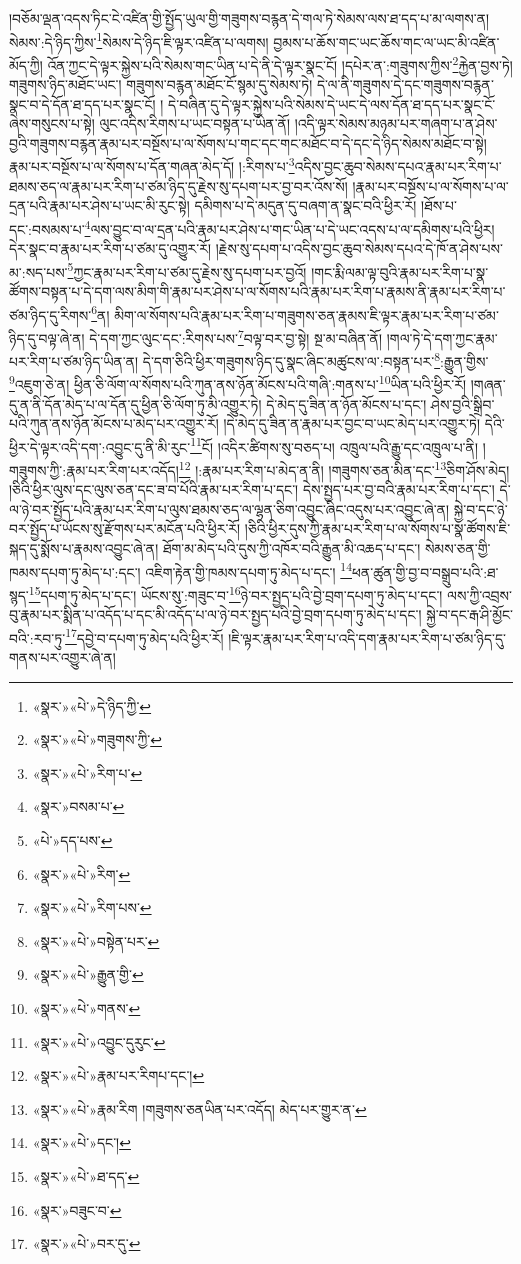 །བཅོམ་ལྡན་འདས་ཏིང་ངེ་འཛིན་གྱི་སྤྱོད་ཡུལ་གྱི་གཟུགས་བརྙན་དེ་གལ་ཏེ་སེམས་ལས་ཐ་དད་པ་མ་ལགས་ན། སེམས་:དེ་ཉིད་ཀྱིས་\footnote{«སྣར་»«པེ་»དེ་ཉིད་ཀྱི་}སེམས་དེ་ཉིད་ཇི་ལྟར་འཛིན་པ་ལགས། བྱམས་པ་ཆོས་གང་ཡང་ཆོས་གང་ལ་ཡང་མི་འཛིན་མོད་ཀྱི། འོན་ཀྱང་དེ་ལྟར་སྐྱེས་པའི་སེམས་གང་ཡིན་པ་དེ་ནི་དེ་ལྟར་སྣང་ངོ། །དཔེར་ན་:གཟུགས་ཀྱིས་\footnote{«སྣར་»«པེ་»གཟུགས་ཀྱི་}རྐྱེན་བྱས་ཏེ། གཟུགས་ཉིད་མཐོང་ཡང་། གཟུགས་བརྙན་མཐོང་ངོ་སྙམ་དུ་སེམས་ཏེ། དེ་ལ་ནི་གཟུགས་དེ་དང་གཟུགས་བརྙན་སྣང་བ་དེ་དོན་ཐ་དད་པར་སྣང་ངོ། །
དེ་བཞིན་དུ་དེ་ལྟར་སྐྱེས་པའི་སེམས་དེ་ཡང་དེ་ལས་དོན་ཐ་དད་པར་སྣང་ངོ་ཞེས་གསུངས་པ་སྟེ། ལུང་འདིས་རིགས་པ་ཡང་བསྟན་པ་ཡིན་ནོ། །འདི་ལྟར་སེམས་མཉམ་པར་གཞག་པ་ན་ཤེས་བྱའི་གཟུགས་བརྙན་རྣམ་པར་བསྔོས་པ་ལ་སོགས་པ་གང་དང་གང་མཐོང་བ་དེ་དང་དེ་ཉིད་སེམས་མཐོང་བ་སྟེ། རྣམ་པར་བསྔོས་པ་ལ་སོགས་པ་དོན་གཞན་མེད་དོ། །:རིགས་པ་\footnote{«སྣར་»«པེ་»རིག་པ་}འདིས་བྱང་ཆུབ་སེམས་དཔའ་རྣམ་པར་རིག་པ་ཐམས་ཅད་ལ་རྣམ་པར་རིག་པ་ཙམ་ཉིད་དུ་རྗེས་སུ་དཔག་པར་བྱ་བར་འོས་སོ། །རྣམ་པར་བསྔོས་པ་ལ་སོགས་པ་ལ་དྲན་པའི་རྣམ་པར་ཤེས་པ་ཡང་མི་རུང་སྟེ། དམིགས་པ་དེ་མདུན་དུ་བཞག་ན་སྣང་བའི་ཕྱིར་རོ། །ཐོས་པ་དང་:བསམས་པ་\footnote{«སྣར་»བསམ་པ་}ལས་བྱུང་བ་ལ་དྲན་པའི་རྣམ་པར་ཤེས་པ་གང་ཡིན་པ་དེ་ཡང་འདས་པ་ལ་དམིགས་པའི་ཕྱིར། དེར་སྣང་བ་རྣམ་པར་རིག་པ་ཙམ་དུ་འགྱུར་རོ། །རྗེས་སུ་དཔག་པ་འདིས་བྱང་ཆུབ་སེམས་དཔའ་དེ་ཁོ་ན་ཤེས་པས་མ་:སད་པས་\footnote{«པེ་»དད་པས་}ཀྱང་རྣམ་པར་རིག་པ་ཙམ་དུ་རྗེས་སུ་དཔག་པར་བྱའོ། །གང་རྨི་ལམ་ལྟ་བུའི་རྣམ་པར་རིག་པ་སྣ་ཚོགས་བསྟན་པ་དེ་དག་ལས་མིག་གི་རྣམ་པར་ཤེས་པ་ལ་སོགས་པའི་རྣམ་པར་རིག་པ་རྣམས་ནི་རྣམ་པར་རིག་པ་ཙམ་ཉིད་དུ་རིགས་\footnote{«སྣར་»«པེ་»རིག་}ན། མིག་ལ་སོགས་པའི་རྣམ་པར་རིག་པ་གཟུགས་ཅན་རྣམས་ཇི་ལྟར་རྣམ་པར་རིག་པ་ཙམ་ཉིད་དུ་བལྟ་ཞེ་ན། དེ་དག་ཀྱང་ལུང་དང་:རིགས་པས་\footnote{«སྣར་»«པེ་»རིག་པས་}བལྟ་བར་བྱ་སྟེ། སྔ་མ་བཞིན་ནོ། །གལ་ཏེ་དེ་དག་ཀྱང་རྣམ་པར་རིག་པ་ཙམ་ཉིད་ཡིན་ན། དེ་དག་ཅིའི་ཕྱིར་གཟུགས་ཉིད་དུ་སྣང་ཞིང་མཚུངས་ལ་:བསྟན་པར་\footnote{«སྣར་»«པེ་»བསྟེན་པར་}:རྒྱུན་གྱིས་\footnote{«སྣར་»«པེ་»རྒྱུན་གྱི་}འཇུག་ཅེ་ན། ཕྱིན་ཅི་ལོག་ལ་སོགས་པའི་ཀུན་ནས་ཉོན་མོངས་པའི་གཞི་:གནས་པ་\footnote{«སྣར་»«པེ་»གནས་}ཡིན་པའི་ཕྱིར་རོ། །གཞན་དུ་ན་ནི་དོན་མེད་པ་ལ་དོན་དུ་ཕྱིན་ཅི་ལོག་ཏུ་མི་འགྱུར་ཏེ། དེ་མེད་དུ་ཟིན་ན་ཉོན་མོངས་པ་དང་། ཤེས་བྱའི་སྒྲིབ་པའི་ཀུན་ནས་ཉོན་མོངས་པ་མེད་པར་འགྱུར་རོ། །དེ་མེད་དུ་ཟིན་ན་རྣམ་པར་བྱང་བ་ཡང་མེད་པར་འགྱུར་ཏེ། དེའི་ཕྱིར་དེ་ལྟར་འདི་དག་:འབྱུང་དུ་ནི་མི་རུང་\footnote{«སྣར་»«པེ་»འབྱུང་དུརུང་}ངོ། །འདིར་ཚིགས་སུ་བཅད་པ། འཁྲུལ་པའི་རྒྱུ་དང་འཁྲུལ་པ་ནི། །གཟུགས་ཀྱི་:རྣམ་པར་རིག་པར་འདོད།\footnote{«སྣར་»«པེ་»རྣམ་པར་རིགཔ་དང་།} །:རྣམ་པར་རིག་པ་མེད་ན་ནི། །གཟུགས་ཅན་མིན་དང་\footnote{«སྣར་»«པེ་»རྣམ་རིག །གཟུགས་ཅནཡིན་པར་འདོད། མེད་པར་གྱུར་ན་}ཅིག་ཤོས་མེད། །ཅིའི་ཕྱིར་ལུས་དང་ལུས་ཅན་དང་ཟ་བ་པོའི་རྣམ་པར་རིག་པ་དང་། དེས་སྤྱད་པར་བྱ་བའི་རྣམ་པར་རིག་པ་དང་། དེ་ལ་ཉེ་བར་སྤྱོད་པའི་རྣམ་པར་རིག་པ་ལུས་ཐམས་ཅད་ལ་ལྷན་ཅིག་འབྱུང་ཞིང་འདུས་པར་འབྱུང་ཞེ་ན། སྐྱེ་བ་དང་ཉེ་བར་སྤྱོད་པ་ཡོངས་སུ་རྫོགས་པར་མངོན་པའི་ཕྱིར་རོ། །ཅིའི་ཕྱིར་དུས་ཀྱི་རྣམ་པར་རིག་པ་ལ་སོགས་པ་སྣ་ཚོགས་ཇི་སྐད་དུ་སྨོས་པ་རྣམས་འབྱུང་ཞེ་ན། ཐོག་མ་མེད་པའི་དུས་ཀྱི་འཁོར་བའི་རྒྱུན་མི་འཆད་པ་དང་། སེམས་ཅན་གྱི་ཁམས་དཔག་ཏུ་མེད་པ་:དང་། འཇིག་རྟེན་གྱི་ཁམས་དཔག་ཏུ་མེད་པ་དང་། \footnote{«སྣར་»«པེ་»དང་།  }ཕན་ཚུན་གྱི་བྱ་བ་བསྒྲུབ་པའི་:ཐ་སྙད་\footnote{«སྣར་»«པེ་»ཐ་དད་}དཔག་ཏུ་མེད་པ་དང་། ཡོངས་སུ་:གཟུང་བ་\footnote{«སྣར་»བཟུང་བ་}ཉེ་བར་སྤྱད་པའི་བྱེ་བྲག་དཔག་ཏུ་མེད་པ་དང་། ལས་ཀྱི་འབྲས་བུ་རྣམ་པར་སྨིན་པ་འདོད་པ་དང་མི་འདོད་པ་ལ་ཉེ་བར་སྤྱད་པའི་བྱེ་བྲག་དཔག་ཏུ་མེད་པ་དང་། སྐྱེ་བ་དང་རྒ་ཤི་མྱོང་བའི་:རབ་ཏུ་\footnote{«སྣར་»«པེ་»བར་དུ་}དབྱེ་བ་དཔག་ཏུ་མེད་པའི་ཕྱིར་རོ། །ཇི་ལྟར་རྣམ་པར་རིག་པ་འདི་དག་རྣམ་པར་རིག་པ་ཙམ་ཉིད་དུ་གནས་པར་འགྱུར་ཞེ་ན། 